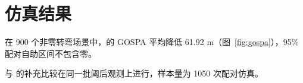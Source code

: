 \section{仿真结果}
在 900 个非零转弯场景中，\method 的 GOSPA 平均降低 61.92 m（图~\ref{fig:gospa}），95\% 配对自助区间不包含零。

与 \gtmethod 的补充比较在同一批阈后观测上进行，样本量为 1050 次配对仿真。

